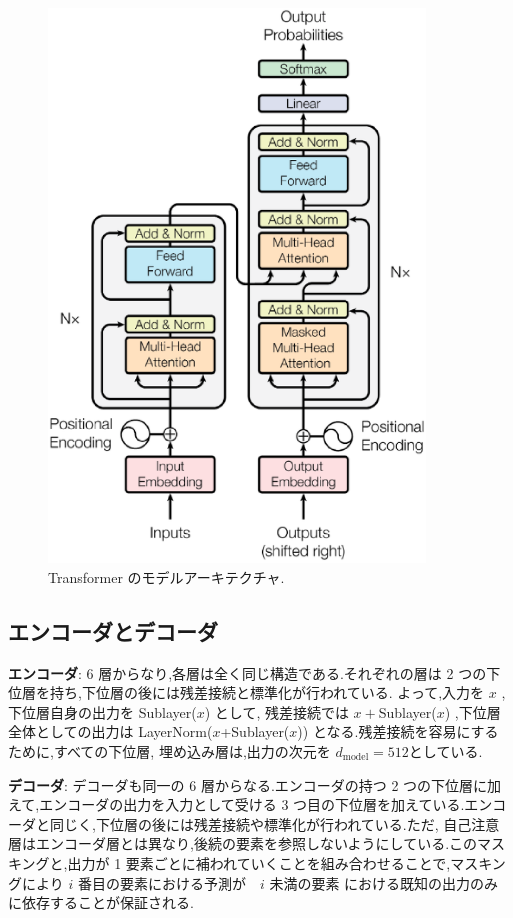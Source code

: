 \documentclass{jarticle}     %
\begin{document}
\begin{figure}[ht]
  \centering
  \includegraphics[width=100mm]{assets/Figure1.eps}
  \caption{ Transformer のモデルアーキテクチャ.}
  \label{Figure1}
\end{figure}


\subsection{エンコーダとデコーダ}
\textbf{エンコーダ}: 6 層からなり,各層は全く同じ構造である.それぞれの層は 2 つの下位層を持ち,下位層の後には残差接続\cite{10}と標準化\cite{1}が行われている.
よって,入力を $x$ , 下位層自身の出力を Sublayer($x$) として, 残差接続では $x+$Sublayer($x$) ,下位層全体としての出力は LayerNorm($x$+Sublayer($x$)) となる\cite{残差接続}.残差接続を容易にするために,すべての下位層, 埋め込み層は,出力の次元を $d_\mathrm{model}=512$としている.\par
\par
\textbf{デコーダ}: デコーダも同一の 6 層からなる.エンコーダの持つ 2 つの下位層に加えて,エンコーダの出力を入力として受ける 3 つ目の下位層を加えている.エンコーダと同じく,下位層の後には残差接続や標準化が行われている.ただ, 自己注意層はエンコーダ層とは異なり,後続の要素を参照しないようにしている.このマスキングと,出力が 1 要素ごとに補われていくことを組み合わせることで,マスキングにより $i$ 番目の要素における予測が　$i$ 未満の要素 における既知の出力のみに依存することが保証される.
\end{document}
